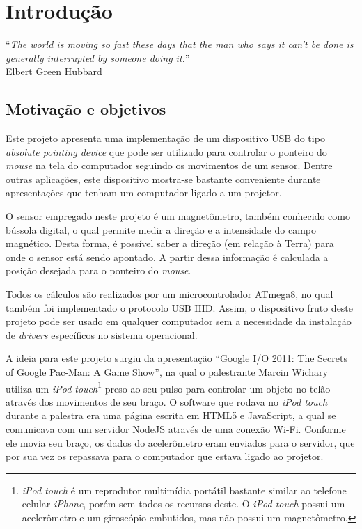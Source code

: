 \documentclass[brazil,pagestart=firstchapter]{abnt}
\begin{document}
\tableofcontents


\chapter{Introdução}
\label{cap:introducao}


\vfill{}
\begin{flushright}{}
``\emph{The world is moving so fast these days that the man who says it
can't be done is generally interrupted by someone doing it.}''\\
{\small Elbert Green Hubbard}
\end{flushright}{\small \par}
\vfill{}

\newpage


\section{Motivação e objetivos}
\label{sec:motivacao}

Este projeto apresenta uma implementação de um dispositivo \acs{USB} do tipo
\textit{absolute pointing device} que pode ser utilizado para controlar o
ponteiro do \textit{mouse} na tela do computador seguindo os movimentos de
um sensor. Dentre outras aplicações, este dispositivo mostra-se bastante
conveniente durante apresentações que tenham um computador ligado a um
projetor.

O sensor empregado neste projeto é um magnetômetro, também conhecido como
bússola digital, o qual permite medir a direção e a intensidade do campo
magnético. Desta forma, é possível saber a direção (em relação à Terra) para
onde o sensor está sendo apontado. A partir dessa informação é calculada
a posição desejada para o ponteiro do \textit{mouse}.

Todos os cálculos são realizados por um microcontrolador ATmega8, no qual
também foi implementado o protocolo \acs{USB} \acs{HID}. Assim, o
dispositivo fruto deste projeto pode ser usado em qualquer computador sem a
necessidade da instalação de \textit{drivers} específicos no sistema
operacional.

A ideia para este projeto surgiu da apresentação ``Google I/O 2011: The
Secrets of Google Pac-Man: A Game Show'', na qual o palestrante Marcin
Wichary utiliza um \textit{iPod touch}\footnote{
	\textit{iPod touch} é um reprodutor multimídia portátil bastante similar
	ao telefone celular \textit{iPhone}, porém sem todos os recursos deste.
	O \textit{iPod touch} possui um acelerômetro e um giroscópio embutidos,
	mas não possui um magnetômetro.
} preso ao seu pulso para controlar um objeto no telão através dos
movimentos de seu braço. \cite[2min29s a 4min40s]{GoogleIO2011} O software
que rodava no \textit{iPod touch} durante a palestra era uma página escrita
em HTML5 e JavaScript, a qual se comunicava com um servidor NodeJS através
de uma conexão Wi-Fi. Conforme ele movia seu braço, os dados do acelerômetro
eram enviados para o servidor, que por sua vez os repassava para o
computador que estava ligado ao projetor.
\end{document}
